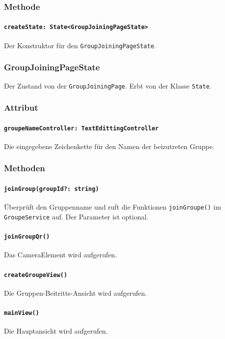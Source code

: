 \documentclass{entwurfsheft}
\begin{document}
        \subsubsection*{Methode}
            \paragraph*{\texttt{createState: State<GroupJoiningPageState>}} Der Konstruktor für den \texttt{GroupJoiningPageState}.
    
    \subsubsection{GroupJoiningPageState}
        Der Zustand von der \texttt{GroupJoiningPage}. Erbt von der Klasse \texttt{State}.
        \subsubsection*{Attribut}
            \paragraph*{\texttt{groupeNameController: TextEdittingController}} Die eingegebene Zeichenkette für den Namen der beizutreten Gruppe.

        \subsubsection*{Methoden}
            \paragraph*{\texttt{joinGroup(groupId?: string)}} Überprüft den Gruppenname und ruft die Funktionen \texttt{joinGroupe()} im \texttt{GroupeService} auf. Der Parameter ist optional.
            \paragraph*{\texttt{joinGroupQr()}} Das CameraElement wird aufgerufen.
            \paragraph*{\texttt{createGroupeView()}} Die Gruppen-Beitritts-Ansicht wird aufgerufen.
            \paragraph*{\texttt{mainView()}} Die Hauptansicht wird aufgerufen.
    
\end{document}
